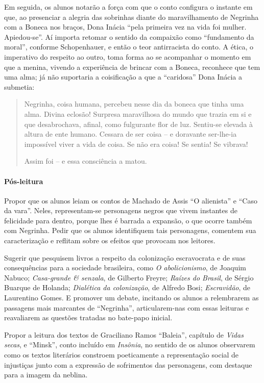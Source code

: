 \documentclass[11pt]{extarticle}
\begin{document}
Em seguida, os alunos notarão a força com que o conto configura o
instante em que, ao presenciar a alegria das sobrinhas diante do
maravilhamento de Negrinha com a Boneca nos braços, Dona Inácia ``pela
primeira vez na vida foi mulher. Apiedou-se''. Aí importa retomar o
sentido da compaixão como ``fundamento da moral'', conforme
Schopenhauer, e então o teor antirracista do conto. A ética, o
imperativo do respeito ao outro, toma forma ao se acompanhar o momento
em que a menina, vivendo a experiência de brincar com a Boneca,
reconhece que tem uma alma; já não suportaria a coisificação a que a
``caridosa'' Dona Inácia a submetia:

\begin{quote}
Negrinha, coisa humana, percebeu nesse dia da boneca que tinha uma alma.
Divina eclosão! Surpresa maravilhosa do mundo que trazia em si e que
desabrochava, afinal, como fulgurante flor de luz. Sentiu-se elevada à
altura de ente humano. Cessara de ser coisa -- e doravante ser-lhe-ia
impossível viver a vida de coisa. Se não era coisa! Se sentia! Se
vibrava!

Assim foi -- e essa consciência a matou.
\end{quote}


\asterisc\paragraph{Pós-leitura}

Propor que os alunos leiam os contos de Machado de Assis ``O alienista''
e ``Caso da vara''. Neles, representam-se personagens negros que vivem
instantes de felicidade para dentro, porque lhes é barrada a expansão, o
que ocorre também com Negrinha. Pedir que os alunos identifiquem tais
personagens, comentem sua caracterização e reflitam sobre os efeitos que
provocam nos leitores.

Sugerir que pesquisem livros a respeito da colonização escravocrata e de
suas consequências para a sociedade brasileira, como \emph{O
abolicionismo}, de Joaquim Nabuco; \emph{Casa-grande \& senzala}, de
Gilberto Freyre; \emph{Raízes do Brasil}, de Sérgio Buarque de Holanda;
\emph{Dialética da colonização}, de Alfredo Bosi; \emph{Escravidão}, de
Laurentino Gomes. E promover um debate, incitando os alunos a
relembrarem as passagens mais marcantes de ``Negrinha'', articularem-nas
com essas leituras e reavaliarem as questões tratadas no bate-papo
inicial.

Propor a leitura dos textos de Graciliano Ramos ``Baleia'', capítulo de
\emph{Vidas secas}, e ``Minsk'', conto incluído em \emph{Insônia}, no
sentido de os alunos observarem como os textos literários constroem
poeticamente a representação social de injustiças junto com a expressão
de sofrimentos das personagens, com destaque para a imagem da neblina.
\end{document}
